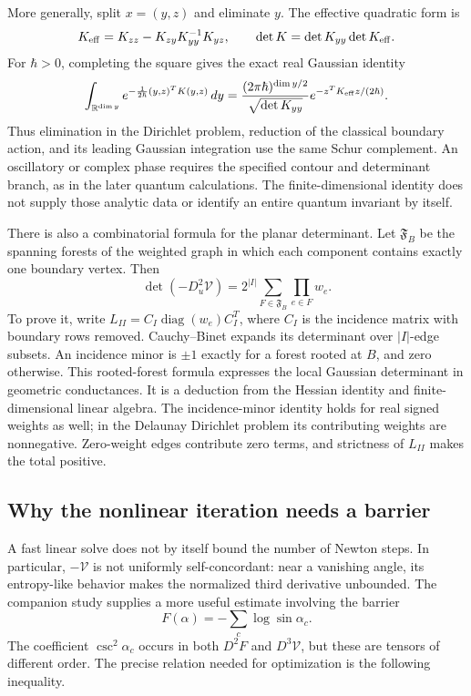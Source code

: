 More generally, split $x=(y,z)$ and eliminate $y$. The effective
quadratic form is
\begin{equation}
 K_{\rm eff}=K_{zz}-K_{zy}K_{yy}^{-1}K_{yz},\qquad
 \det K=\det K_{yy}\det K_{\rm eff}.
 \label{eq:ipolySchur}
\end{equation}
For $\hbar>0$, completing the square gives the exact real Gaussian identity
\begin{equation}
 \int_{\mathbb R^{\dim y}}
 e^{-\frac1{2\hbar}(y,z)^TK(y,z)}\,dy
 =\frac{(2\pi\hbar)^{\dim y/2}}{\sqrt{\det K_{yy}}}
       e^{-z^TK_{\rm eff}z/(2\hbar)}.
 \label{eq:ipolyGaussian}
\end{equation}
Thus elimination in the Dirichlet problem, reduction of the classical
boundary action, and its leading Gaussian integration use the same
Schur complement. An oscillatory or complex phase requires the specified
contour and determinant branch, as in the later quantum calculations.
The finite-dimensional identity does not supply those analytic data
or identify an entire quantum invariant by itself.

There is also a combinatorial formula for the planar determinant. Let
$\mathfrak F_B$ be the spanning forests of the weighted graph in which
each component contains exactly one boundary vertex. Then
\begin{equation}
 \boxed{\det(-D_u^2\mathcal V)
      =2^{|I|}\sum_{F\in\mathfrak F_B}\prod_{e\in F}w_e.}
 \label{eq:ipolyForestDeterminant}
\end{equation}
To prove it, write $L_{II}=C_I\operatorname{diag}(w_e)C_I^T$, where
$C_I$ is the incidence matrix with boundary rows removed. Cauchy--Binet
expands its determinant over $|I|$-edge subsets. An incidence minor is
$\pm1$ exactly for a forest rooted at $B$, and zero otherwise. This
rooted-forest formula expresses the local Gaussian determinant in
geometric conductances. It is a deduction from the Hessian identity
and finite-dimensional linear algebra. The incidence-minor identity
holds for real signed weights as well; in the Delaunay Dirichlet problem
its contributing weights are nonnegative. Zero-weight edges contribute
zero terms, and strictness of $L_{II}$ makes the total positive.

\subsection{Why the nonlinear iteration needs a barrier}
\label{subsec:ipolyBarrierComplexity}

A fast linear solve does not by itself bound the number of Newton
steps. In particular, $-\mathcal V$ is not uniformly self-concordant:
near a vanishing angle, its entropy-like behavior makes the normalized
third derivative unbounded. The companion study supplies a more useful
estimate involving the barrier
\begin{equation}
 F(\alpha)=-\sum_c\log\sin\alpha_c.
 \label{eq:ipolyBarrier}
\end{equation}
The coefficient $\csc^2\alpha_c$ occurs in both $D^2F$ and
$D^3\mathcal V$, but these are tensors of different order. The precise
relation needed for optimization is the following inequality.

